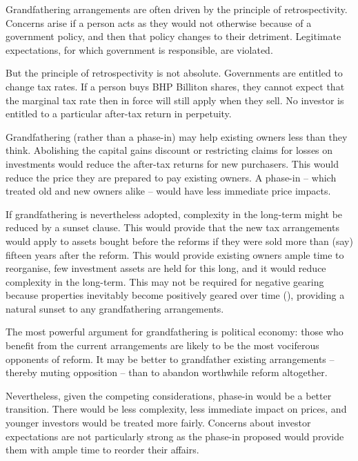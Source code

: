 \documentclass{grattan}\usepackage[]{graphicx}\usepackage[]{color}
\begin{document}
Grandfathering arrangements are often driven by the principle of retrospectivity. Concerns arise if a person acts as they would not otherwise because of a government policy, and then that policy changes to their detriment. Legitimate expectations, for which government is responsible, are violated. 

But the principle of retrospectivity is not absolute. Governments are entitled to change tax rates. If a person buys BHP Billiton shares, they cannot expect that the marginal tax rate then in force will still apply when they sell. No investor is entitled to a particular after-tax return in perpetuity.

Grandfathering (rather than a phase-in) may help existing owners less than they think. Abolishing the capital gains discount or restricting claims for losses on investments would reduce the after-tax returns for new purchasers. This would reduce the price they are prepared to pay existing owners. A phase-in -- which treated old and new owners alike -- would have less immediate price impacts.

If grandfathering is nevertheless adopted, complexity in the long-term might be reduced by a sunset clause. This would provide that the new tax arrangements would apply to assets bought before the reforms if they were sold more than (say) fifteen years after the reform. This would provide existing owners ample time to reorganise, few investment assets are held for this long, and it would reduce complexity in the long-term. This may not be required for negative gearing because properties inevitably become positively geared over time (), providing a natural sunset to any grandfathering arrangements.

The most powerful argument for grandfathering is political economy: those who benefit from the current arrangements are likely to be the most vociferous opponents of reform. It may be better to grandfather existing arrangements -- thereby muting opposition -- than to abandon worthwhile reform altogether.  

Nevertheless, given the competing considerations, phase-in would be a better transition. There would be less complexity, less immediate impact on prices, and younger investors would be treated more fairly. Concerns about investor expectations are not particularly strong as the phase-in proposed would provide them with ample time to reorder their affairs.


\onecolumn
\end{document}

